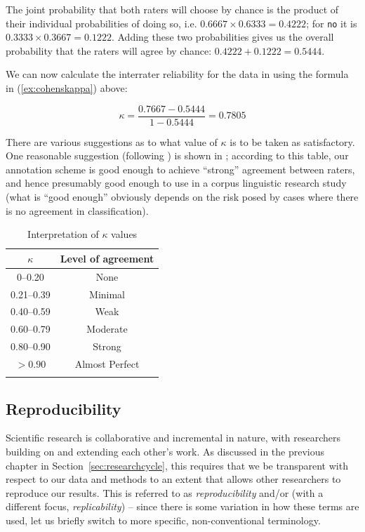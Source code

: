 The joint probability  that both raters will choose  by chance  is the product of their individual probabilities of doing so, i.e. $0.6667 \times 0.6333 = 0.4222$; for \texttt{no} it is $0.3333 \times 0.3667 = 0.1222$. Adding these two probabilities gives us the overall probability that the raters will agree by chance:  $0.4222 + 0.1222 = 0.5444$.

We can now calculate the interrater  reliability for the data in  using the formula in (\ref{ex:cohenskappa}) above:

\[\kappa = \frac{0.7667 - 0.5444}{1 - 0.5444} = 0.7805\]

There are various suggestions as to what value of $\kappa$ is to be taken as satisfactory. One reasonable suggestion (following \citealt{mchugh_interrater_2012}) is shown in ; according to this table, our annotation  scheme is good enough to achieve ``strong'' agreement between raters, and hence presumably good enough to use in a corpus linguistic research study (what is ``good enough'' obviously depends on the risk posed by cases where there is no agreement in classification).

\begin{table}
\caption{Interpretation of $\kappa$ values}
\label{tab:kappalevels}
\begin{tabular}[t]{cc}
\lsptoprule
$\kappa$ & Level of agreement \\
\midrule
0--0.20 & None \\
0.21--0.39 & Minimal \\
0.40--0.59 & Weak \\
0.60--0.79 & Moderate \\
0.80--0.90 & Strong \\
$>0.90$ & Almost Perfect \\
\lspbottomrule
\end{tabular}
\end{table}

\subsection{Reproducibility}
\label{sec:reproducibility}

Scientific research is collaborative and incremental in nature, with researchers building on and extending each other's work. As discussed in the previous chapter in Section~\ref{sec:researchcycle}, this requires that we be transparent with respect to our data and methods to an extent that allows other researchers to reproduce our results. This is referred to as \textit{reproducibility}  and\slash or (with a different focus, \textit{replicability})  -- since there is some variation  in how these terms are used, let us briefly switch to more specific, non\hyp{}conventional terminology.

